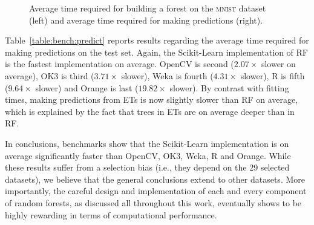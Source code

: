 \begin{figure}
\hspace{-1.5cm}
\caption{Average time required for building a forest on the \textsc{mnist} dataset (left) and average time required for making predictions (right).}
\label{fig:5:benchmarks:mnist}
\end{figure}

Table~\ref{table:bench:predict} reports results regarding the average time
required for making predictions on the test set. Again, the Scikit-Learn implementation of RF is the
fastest implementation on average. OpenCV is second ($2.07\times$ slower on
average), OK3 is third ($3.71\times$ slower), Weka is fourth ($4.31\times$
slower), R is fifth ($9.64\times$ slower) and Orange is last ($19.82\times$
slower). By contrast with fitting times, making predictions from ETs is now
slightly slower than RF on average, which is explained by the fact that trees in ETs
are on average deeper than in RF.

In conclusions, benchmarks show that the Scikit-Learn implementation is on
average significantly faster than OpenCV, OK3, Weka, R and Orange.  While these
results suffer from a selection bias (i.e., they depend on the 29 selected
datasets), we believe that the general conclusions extend to other datasets.
More importantly, the careful design and implementation of  each and every
component of random forests, as discussed all throughout this work, eventually
shows to be highly rewarding in terms of computational performance.

